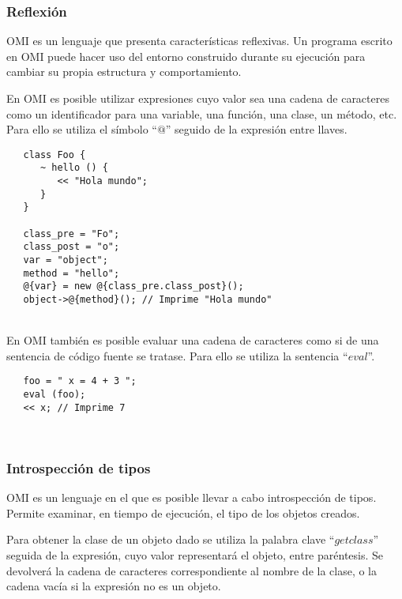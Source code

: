 \subsubsection{Reflexión}
OMI es un lenguaje que presenta características reflexivas. Un programa escrito en OMI puede hacer uso del entorno construido durante su ejecución para cambiar su propia estructura
y comportamiento.

En OMI es posible utilizar expresiones cuyo valor sea una cadena de caracteres como un identificador para una variable, una función, una clase, un método, etc. Para ello se 
utiliza el símbolo ``$@$'' seguido de la expresión entre llaves. \\

\begin{lstlisting}
   class Foo {
      ~ hello () {
         << "Hola mundo";
      }
   }
   
   class_pre = "Fo";
   class_post = "o";
   var = "object";
   method = "hello";
   @{var} = new @{class_pre.class_post}();
   object->@{method}(); // Imprime "Hola mundo"
\end{lstlisting}
\hfill\\ 

En OMI también es posible evaluar una cadena de caracteres como si de una sentencia de código fuente se tratase. Para ello se utiliza la sentencia ``$eval$''. \\

\begin{lstlisting}
   foo = " x = 4 + 3 ";
   eval (foo);
   << x; // Imprime 7
\end{lstlisting}
\hfill\\ 

\subsubsection{Introspección de tipos}

OMI es un lenguaje en el que es posible llevar a cabo introspección de tipos. Permite examinar, en tiempo de ejecución, el tipo de los objetos creados. 

Para obtener la clase de un objeto dado se utiliza la palabra clave ``$getclass$'' seguida de la expresión, cuyo valor representará el objeto, entre paréntesis. Se devolverá
la cadena de caracteres correspondiente al nombre de la clase, o la cadena vacía si la expresión no es un objeto. \\

